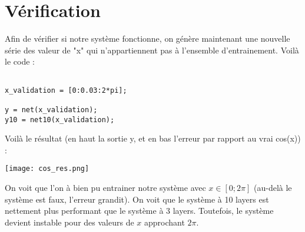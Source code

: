 \section{Vérification}

Afin de vérifier si notre système fonctionne, on génère maintenant une nouvelle série des valeur de "x" qui n'appartiennent pas à l'ensemble d'entrainement. Voilà le code :

\begin{lstlisting}[frame=single,style=C]  % Start your code-block

x_validation = [0:0.03:2*pi];

y = net(x_validation);
y10 = net10(x_validation);
\end{lstlisting}

Voilà le résultat (en haut la sortie y, et en bas l'erreur par rapport au vrai cos(x)) : 
\begin{center} 
\hspace{15cm}
\texttt{[image: cos\_res.png]}
\end{center}
\vspace{1cm}


On voit que l'on à bien pu entrainer notre système avec $x \in [0;2\pi]$ (au-delà le système est faux, l'erreur grandit). On voit que le système à 10 layers est nettement plus performant que le système à 3 layers. Toutefois, le système devient instable pour des valeurs de $x$ approchant $2\pi$.   